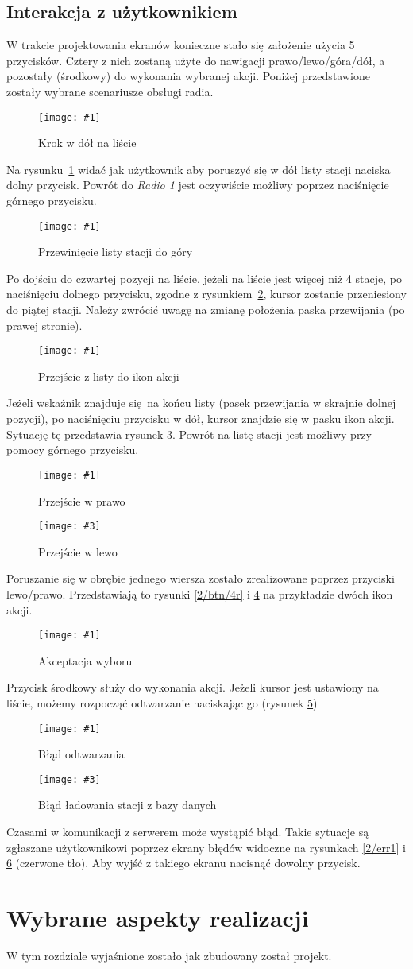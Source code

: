 \documentclass[12pt]{report}
\newcommand{\imgint}[4]{
	\begin{figure}[{#4}]
		\centering
		\texttt{[image: \#1]}
		\caption{#2}
		\label{#1}
	\end{figure}
}
\newcommand{\imgh}[3]{\imgint{#1}{#2}{#3}{H}}
\newcommand{\imgintss}[5]{
	\begin{figure}[{#5}]
		\centering
		\begin{minipage}{.45\textwidth}
			\centering
			\texttt{[image: \#1]}
			\caption{#2}
			\label{#1}
		\end{minipage}%
		\hfill
		\begin{minipage}{.45\textwidth}
			\centering
			\texttt{[image: \#3]}
			\caption{#4}
			\label{#3}
		\end{minipage}
	\end{figure}
}
\newcommand{\imghss}[4]{\imgintss{#1}{#2}{#3}{#4}{H}}
\begin{document}
	\section{Interakcja z użytkownikiem}
		W trakcie projektowania ekranów konieczne stało się założenie użycia 5 przycisków. Cztery z nich zostaną użyte do nawigacji prawo/lewo/góra/dół, a pozostały (środkowy) do wykonania wybranej akcji. Poniżej przedstawione zostały wybrane scenariusze obsługi radia.
		
		\imgh{2/btn/1}{Krok w dół na liście}{0.7}
		Na rysunku~\ref{2/btn/1} widać jak użytkownik aby poruszyć się w dół listy stacji naciska dolny przycisk. Powrót do \textit{Radio 1} jest oczywiście możliwy poprzez naciśnięcie górnego przycisku.
		
		\imgh{2/btn/2}{Przewinięcie listy stacji do góry}{0.7}
		Po dojściu do czwartej pozycji na liście, jeżeli na liście jest więcej niż 4 stacje, po naciśnięciu dolnego przycisku, zgodne z rysunkiem~\ref{2/btn/2}, kursor zostanie przeniesiony do piątej stacji. Należy zwrócić uwagę na zmianę położenia paska przewijania (po prawej stronie).
		
		\imgh{2/btn/3}{Przejście z listy do ikon akcji}{0.7}
		Jeżeli wskaźnik znajduje się na końcu listy (pasek przewijania w skrajnie dolnej pozycji), po naciśnięciu przycisku w dół, kursor znajdzie się w pasku ikon akcji. Sytuację tę przedstawia rysunek \ref{2/btn/3}. Powrót na listę stacji jest możliwy przy pomocy górnego przycisku.
		
		\imghss{2/btn/4r}{Przejście w prawo}{2/btn/4l}{Przejście w lewo}
		Poruszanie się w obrębie jednego wiersza zostało zrealizowane poprzez przyciski \mbox{lewo/prawo}. Przedstawiają to rysunki \ref{2/btn/4r} i \ref{2/btn/4l} na przykładzie dwóch ikon akcji.
		
		\imgh{2/btn/5}{Akceptacja wyboru}{0.7}
		Przycisk środkowy służy do wykonania akcji. Jeżeli kursor jest ustawiony na liście, możemy rozpocząć odtwarzanie naciskając go (rysunek \ref{2/btn/5})
		
		\imghss{2/err1}{Błąd odtwarzania}{2/err2}{Błąd ładowania stacji z bazy danych}
		Czasami w komunikacji z serwerem może wystąpić błąd. Takie sytuacje są zgłaszane użytkownikowi poprzez ekrany błędów widoczne na rysunkach \ref{2/err1} i \ref{2/err2} (czerwone tło). Aby wyjść z takiego ekranu nacisnąć dowolny przycisk.
	
	\chapter{Wybrane aspekty realizacji}
	W tym rozdziale wyjaśnione zostało jak zbudowany został projekt.
	
\end{document}
